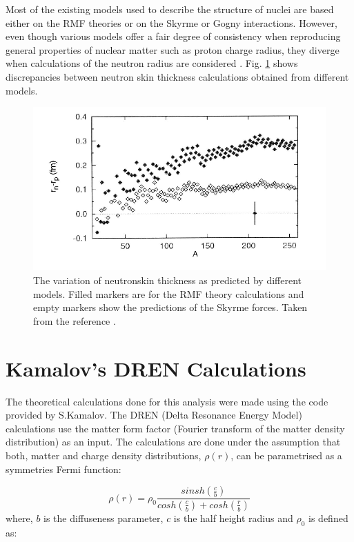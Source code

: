 \indent Most of the existing models used to describe the structure of nuclei are based either on the RMF theories or on the Skyrme or Gogny interactions. However, even though various models offer a fair degree of consistency when reproducing general properties of nuclear matter such as proton charge radius, they diverge when calculations of the neutron radius are considered \cite{pomorski, horovitz}. Fig. \ref{skinmass} shows discrepancies between neutron skin thickness calculations obtained from different models.

\begin{figure}[H]
\begin{center}
\includegraphics[scale=0.55]{pictures/png/skinmass.png}
\caption{The variation of neutronskin thickness as predicted by different models. Filled markers are for the RMF theory calculations and empty markers show the predictions of the Skyrme forces. Taken from the reference \cite{horovitz}.}
\label{skinmass}
\end{center}
\end{figure}

\section{Kamalov's DREN Calculations}

\indent The theoretical calculations done for this analysis were made using the code provided by S.Kamalov.
\indent The DREN (Delta Resonance Energy Model) calculations use the matter form factor (Fourier transform of the matter density distribution) as an input. The calculations are done under the assumption that both, matter and charge density distributions, $\rho(r)$, can be parametrised as a symmetries Fermi function:

\begin{equation}
\rho(r)=\rho_{0}\frac{sinsh\left(\frac{c}{b}\right)}{cosh\left(\frac{c}{b}\right)+cosh\left(\frac{r}{b}\right)}
\end{equation}
where, $b$ is the diffuseness parameter, $c$ is the half height radius and $\rho_{0}$ is defined as:

